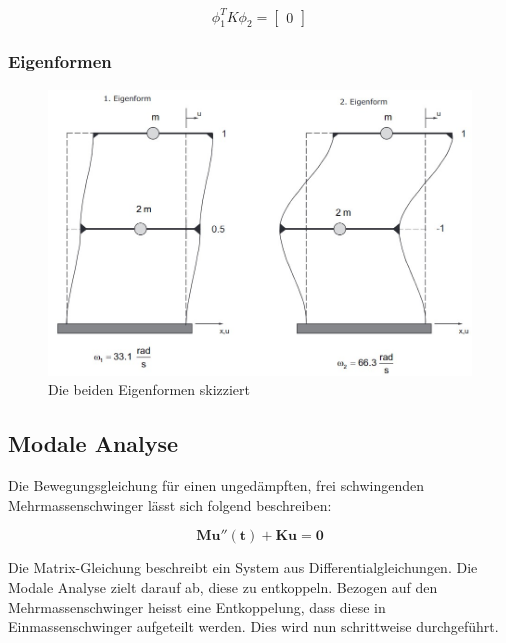 \documentclass[
  letterpaper,
  DIV=11]{scrreprt}
\begin{document}
\begin{equation*}\phi_{1}^{T} K \phi_{2} = \left[\begin{matrix}0\end{matrix}\right]\end{equation*}

\hypertarget{eigenformen-2}{%
\subsubsection{Eigenformen}\label{eigenformen-2}}

\begin{figure}[H]

{\centering \includegraphics{bilder/eigenformen_mms2.jpg}

}

\caption{\label{fig-eigenformen}Die beiden Eigenformen skizziert}

\end{figure}

\hypertarget{modale-analyse-1}{%
\subsection{Modale Analyse}\label{modale-analyse-1}}

Die Bewegungsgleichung für einen ungedämpften, frei schwingenden
Mehrmassenschwinger lässt sich folgend beschreiben:

\[\mathbf{M u''(t) + K u = 0}\]

Die Matrix-Gleichung beschreibt ein System aus Differentialgleichungen.
Die Modale Analyse zielt darauf ab, diese zu entkoppeln. Bezogen auf den
Mehrmassenschwinger heisst eine Entkoppelung, dass diese in
Einmassenschwinger aufgeteilt werden. Dies wird nun schrittweise
durchgeführt.
\end{document}
